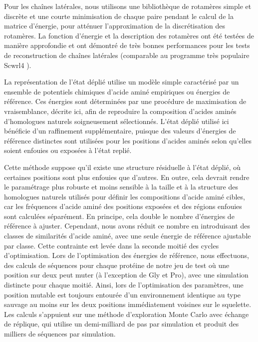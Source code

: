 Pour les chaînes latérales, nous utilisons une bibliothèque de rotamères simple et discrète et une courte minimisation de chaque paire pendant le calcul de la matrice d'énergie, pour atténuer l'approximation de la discrétisation des rotamères. La fonction d'énergie et la description des rotamères ont été testées de manière approfondie et ont démontré de très bonnes performances pour les tests de reconstruction de chaînes latérales \cite{Gaillard16} (comparable au programme très populaire Scwrl4 \cite{Krivov09}).

La représentation de l'état déplié utilise un modèle simple caractérisé par un ensemble de potentiels chimiques d'acide aminé empiriques ou énergies de référence. Ces énergies sont déterminées par une procédure de maximisation de vraisemblance, décrite ici, afin de reproduire la composition d'acides aminés d'homologues naturels soigneusement sélectionnés. L'état déplié utilisé ici bénéficie d'un raffinement supplémentaire, puisque des valeurs d'énergies de référence distinctes sont utilisées pour les positions d'acides aminés selon qu'elles soient enfouies ou exposées à l'état replié.  

Cette méthode suppose qu'il existe une structure résiduelle à l'état déplié, où certaines positions sont plus enfouies que d'autres. En outre, cela devrait rendre le paramétrage plus robuste et moins sensible à la taille et à la structure des homologues naturels utilisés pour définir les compositions d'acide aminé cibles, car les fréquences d'acide aminé des positions exposées et des régions enfouies sont calculées séparément. En principe, cela double le nombre d'énergies de référence à ajuster. Cependant, nous avons réduit ce nombre en introduisant des classes de similarités d'acide aminé, avec une seule énergie de référence ajustable par classe. Cette contrainte est levée dans la seconde moitié des cycles d'optimisation. Lors de l'optimisation des énergies de référence, nous effectuons, des calculs de séquences pour chaque protéine de notre jeu de test où une position sur deux peut muter (à l'exception de Gly et Pro), avec une simulation distincte pour chaque moitié. Ainsi, lors de l'optimisation des paramètres, une position mutable est toujours entourée d'un environnement identique au type sauvage au moins sur les deux positions immédiatement voisines sur le squelette. Les calculs s'appuient sur une méthode d'exploration Monte Carlo avec échange de réplique, qui utilise un demi-milliard de pas par simulation et produit des milliers de séquences par simulation.

